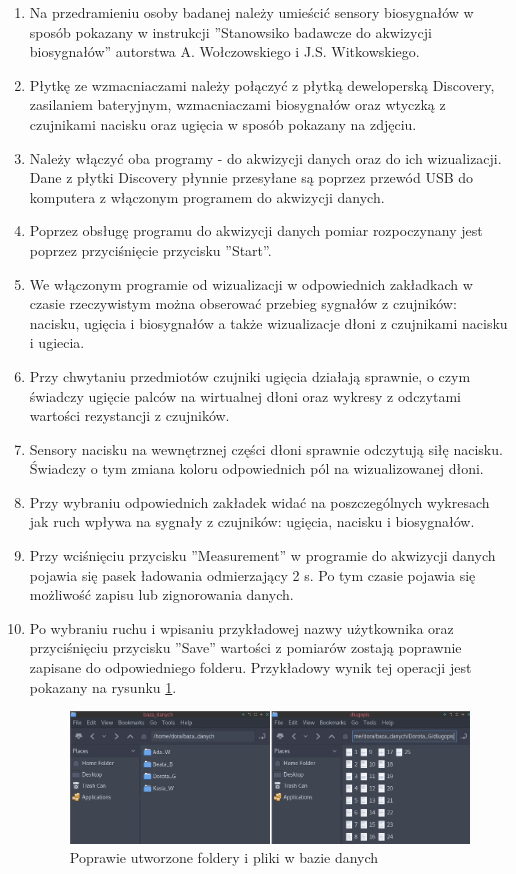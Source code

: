 \documentclass{article}
\begin{document}
\begin{enumerate}
	\item Na przedramieniu osoby badanej należy umieścić sensory biosygnałów w sposób pokazany w instrukcji ''Stanowsiko badawcze do akwizycji biosygnałów'' autorstwa A. Wołczowskiego i J.S. Witkowskiego.
	\item Płytkę ze wzmacniaczami należy połączyć z płytką deweloperską Discovery, zasilaniem bateryjnym, wzmacniaczami biosygnałów oraz wtyczką z czujnikami nacisku oraz ugięcia w sposób pokazany na zdjęciu.
	\item Należy włączyć oba programy - do akwizycji danych oraz do ich wizualizacji. Dane z płytki Discovery płynnie przesyłane są poprzez przewód USB do komputera z włączonym programem do akwizycji danych.
	\item Poprzez obsługę programu do akwizycji danych pomiar rozpoczynany jest poprzez przyciśnięcie przycisku ''Start''.
	\item We włączonym programie od wizualizacji w odpowiednich zakładkach w czasie rzeczywistym można obserować przebieg sygnałów z czujników: nacisku, ugięcia i biosygnałów a także wizualizacje dłoni z czujnikami nacisku i ugiecia.
	\item Przy chwytaniu przedmiotów czujniki ugięcia działają sprawnie, o czym świadczy ugięcie palców na wirtualnej dłoni oraz wykresy z odczytami wartości rezystancji z czujników.
	\item Sensory nacisku na wewnętrznej części dłoni sprawnie odczytują siłę nacisku. Świadczy o tym zmiana koloru odpowiednich pól na wizualizowanej dłoni.
	\item Przy wybraniu odpowiednich zakładek widać na poszczególnych wykresach jak ruch wpływa na sygnały z czujników: ugięcia, nacisku i biosygnałów.
	\item Przy wciśnięciu przycisku ''Measurement'' w programie do akwizycji danych pojawia się pasek ładowania odmierzający 2 s. Po tym czasie pojawia się możliwość zapisu lub zignorowania danych.
	\item Po wybraniu ruchu i wpisaniu przykładowej nazwy użytkownika oraz przyciśnięciu przycisku ''Save'' wartości z pomiarów zostają poprawnie zapisane do odpowiedniego folderu. Przykładowy wynik tej operacji jest pokazany na rysunku \ref{rys:baza_folder}.
	
	\begin{figure}[H]
    \centering
    \includegraphics[width=15cm]{baza_folder.png}
    \caption{Poprawie utworzone foldery i pliki w bazie danych}
    \label{rys:baza_folder}
  \end{figure}
	
\end{enumerate}
\end{document}
